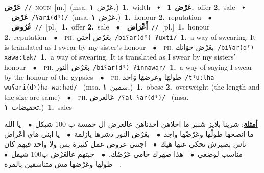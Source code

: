 \documentclass[10pt,a4paper,twoside]{article} %
\begin{document}
\begin{multicols}{2}
{\setlength\topsep{0pt}\textbf{\foreignlanguage{arabic}{عَرْض}}\ {\color{gray}\texttt{//}\color{black}}\ \textsc{noun}\ [m.]\ \color{gray}(msa. \foreignlanguage{arabic}{عَرْض}~\foreignlanguage{arabic}{\textbf{١.}})\color{black}\ \textbf{1.}~width\ \ $\smblkdiamond$\ \ \setlength\topsep{0pt}\textbf{\foreignlanguage{arabic}{عَرْض}}\ \textbf{1.}~offer  \textbf{2.}~sale\ \ $\smblkdiamond$\ \ \setlength\topsep{0pt}\textbf{\foreignlanguage{arabic}{عَرْض}}\ {\color{gray}\texttt{/ʕari(dˤ)/}\color{black}}\ \color{gray}(msa. \foreignlanguage{arabic}{عَرْض}~\foreignlanguage{arabic}{\textbf{١.}})\color{black}\ \textbf{1.}~honour  \textbf{2.}~reputation\ \ $\bullet$\ \ \setlength\topsep{0pt}\textbf{\foreignlanguage{arabic}{عُرُوض}}\ {\color{gray}\texttt{//}\color{black}}\ [pl.]\ \textbf{1.}~offer  \textbf{2.}~sale\ \ $\bullet$\ \ \setlength\topsep{0pt}\textbf{\foreignlanguage{arabic}{أَعْرَاض}}\ {\color{gray}\texttt{//}\color{black}}\ [pl.]\ \textbf{1.}~honour  \textbf{2.}~reputation\ \ $\bullet$\ \ \textsc{ph.} \color{gray} \foreignlanguage{arabic}{بعَرْض أختي}\color{black}\ {\color{gray}\texttt{/{\sffamily biʕar(dˤ) ʔuxti}/}\color{black}}\ \textbf{1.}~a way of  swearing. It is translated as I swear by my sister's honour\ \ $\bullet$\ \ \textsc{ph.} \color{gray} \foreignlanguage{arabic}{بعَرْض خوَاتك}\color{black}\ {\color{gray}\texttt{/{\sffamily biʕar(dˤ) xawaːtak}/}\color{black}}\ \textbf{1.}~a way of  swearing. It is translated as I swear by my sisters' honour\ \ $\bullet$\ \ \textsc{ph.} \color{gray} \foreignlanguage{arabic}{بعَرْض النور}\color{black}\ {\color{gray}\texttt{/{\sffamily biʕar(dˤ) ʔinnawar}/}\color{black}}\ \textbf{1.}~a way of saying I swear by the honour of the gypsies\ \ $\bullet$\ \ \textsc{ph.} \color{gray} \foreignlanguage{arabic}{طولهَا وعرضهَا وَاحد}\color{black}\ {\color{gray}\texttt{/{\sffamily tˤuːlha wuʕari(dˤ)ha waːħad}/}\color{black}}\ \color{gray} (msa. \foreignlanguage{arabic}{سمين}~\foreignlanguage{arabic}{\textbf{١.}})\color{black}\ \textbf{1.}~obese  \textbf{2.}~overweight (the length and the size are same)\ \ $\bullet$\ \ \textsc{ph.} \color{gray} \foreignlanguage{arabic}{عَالعرض}\color{black}\ {\color{gray}\texttt{/{\sffamily ʕal ʕar(dˤ)}/}\color{black}}\ \color{gray} (msa. \foreignlanguage{arabic}{تخفيضات}~\foreignlanguage{arabic}{\textbf{١.}})\color{black}\ \textbf{1.}~sales\  \begin{flushright}\color{gray}\foreignlanguage{arabic}{\textbf{\underline{\foreignlanguage{arabic}{أمثلة}}}: شرينا بلايز شَنبر ما احلاهن أخذناهن عالعرض ال خمسة ب 100 شيكل\ $\bullet$\ \  يا الله ما انصحها طولْها وعَرْضْها واحِد\ $\bullet$\ \  بعَرْض النور دشرها يازلمة\ $\bullet$\ \  يا ابني هاي أعْراض ناس بصيرش تحكي عنها هيك\ $\bullet$\ \  اجتني عروض عمل كثيرة بس ولا واحد فيهم كان مناسب لوضعي\ $\bullet$\ \  هذا صهرك حامي عَرْضَك.\ $\bullet$\ \  جبتهم عالعَرْض ب100 شيقل\ $\bullet$\ \  طولها وعَرْضها مش متناسقين بالمرة.}\end{flushright}\color{black}} \vspace{2mm}


\end{multicols}
\end{document}
